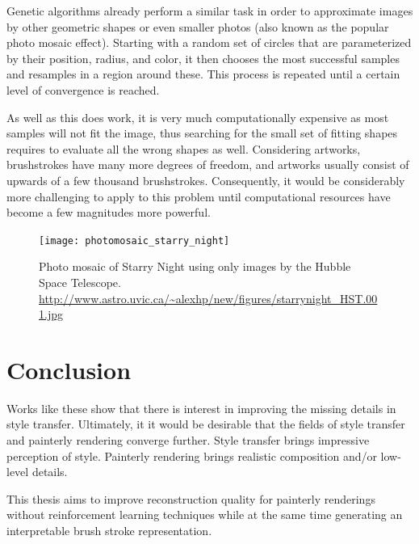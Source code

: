 Genetic algorithms already perform a similar task in order to approximate images by other geometric shapes or even smaller photos (also known as the popular photo mosaic effect).
Starting with a random set of circles that are parameterized by their position, radius, and color, it then chooses the most successful samples and resamples in a region around these.
This process is repeated until a certain level of convergence is reached.


As well as this does work, it is very much computationally expensive as most samples will not fit the image, thus searching for the small set of fitting shapes requires to evaluate all the wrong shapes as well.
Considering artworks, brushstrokes have many more degrees of freedom, and artworks usually consist of upwards of a few thousand brushstrokes.
Consequently, it would be considerably more challenging to apply to this problem until computational resources have become a few magnitudes more powerful.

\begin{figure}
    \texttt{[image: photomosaic\_starry\_night]}
    \caption[]{Photo mosaic of Starry Night using only images by the Hubble Space Telescope. \url{http://www.astro.uvic.ca/~alexhp/new/figures/starrynight_HST.001.jpg}}
\end{figure}



\section{Conclusion}
Works like these show that there is interest in improving the missing details in style transfer.
Ultimately, it it would be desirable that the fields of style transfer and painterly rendering converge further.
Style transfer brings impressive perception of style.
Painterly rendering brings realistic composition and/or low-level details.

This thesis aims to improve reconstruction quality for painterly renderings without reinforcement learning techniques while at the same time generating an interpretable brush stroke representation.
